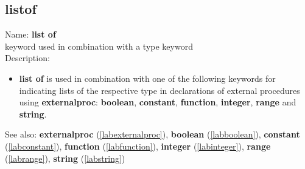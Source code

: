 \subsection{listof}
\label{lablistof}
\noindent Name: \textbf{list of}\\
keyword used in combination with a type keyword\\
\noindent Description: \begin{itemize}

\item \textbf{list of} is used in combination with one of the following keywords for
   indicating lists of the respective type in declarations of external
   procedures using \textbf{externalproc}: \textbf{boolean}, \textbf{constant}, \textbf{function},
   \textbf{integer}, \textbf{range} and \textbf{string}.
\end{itemize}
See also: \textbf{externalproc} (\ref{labexternalproc}), \textbf{boolean} (\ref{labboolean}), \textbf{constant} (\ref{labconstant}), \textbf{function} (\ref{labfunction}), \textbf{integer} (\ref{labinteger}), \textbf{range} (\ref{labrange}), \textbf{string} (\ref{labstring})
